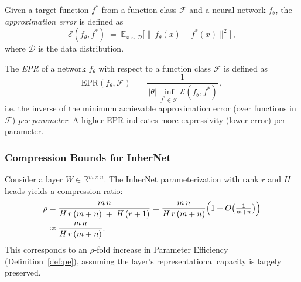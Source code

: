 \documentclass{article} %
\begin{document}
\begin{definition}
\label{def:approx-error}
Given a target function $f^*$ from a function class $\mathcal{F}$ and a neural network $f_\theta$, the \emph{approximation error} is defined as 
\[
\mathcal{E}(f_\theta, f^*) \;=\; \mathbb{E}_{x \sim \mathcal{D}}\big[\|\,f_\theta(x) - f^*(x)\|^2\big]\,,
\] 
where $\mathcal{D}$ is the data distribution.
\end{definition}

\begin{definition}
\label{def:epr}
The \emph{EPR} of a network $f_\theta$ with respect to a function class $\mathcal{F}$ is defined as 
\[
\text{EPR}(f_\theta, \mathcal{F}) \;=\; \frac{1}{\,|\theta|\,\inf_{f^* \in \mathcal{F}} \mathcal{E}(f_\theta, f^*)}\,,
\] 
i.e. the inverse of the minimum achievable approximation error (over functions in $\mathcal{F}$) \emph{per parameter}. A higher EPR indicates more expressivity (lower error) per parameter.
\end{definition}

\subsubsection{Compression Bounds for InherNet}

\begin{theorem}
\label{thm:reduction}
Consider a layer $W \in \mathbb{R}^{m \times n}$. The InherNet parameterization with rank $r$ and $H$ heads yields a compression ratio:
\begin{equation}
\begin{aligned}
\rho
&= \frac{m\,n}{H\,r\,(m+n)\;+\;H\,(r+1)}
= \frac{m\,n}{H\,r\,(m+n)}
\Bigl(1 + O\bigl(\tfrac1{m+n}\bigr)\Bigr) \\
&\approx \frac{m\,n}{H\,r\,(m+n)}.
\nonumber
\end{aligned}
\end{equation}
This corresponds to an $\rho$-fold increase in Parameter Efficiency (Definition~\ref{def:pe}), assuming the layer's representational capacity is largely preserved.
\end{theorem}
\end{document}

